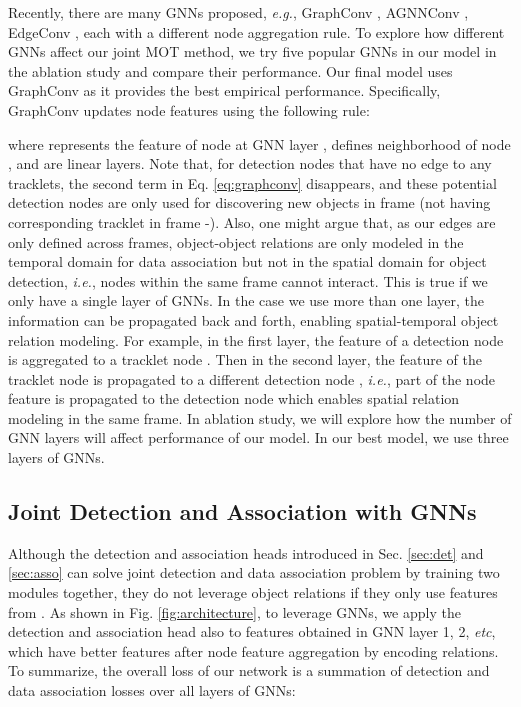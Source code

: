 \documentclass[letterpaper, 10 pt, conference]{ieeeconf}
\begin{document}
Recently, there are many GNNs proposed, \emph{e.g.}, GraphConv \cite{Morris2019}, AGNNConv \cite{thekumparampil2018attentionbased}, EdgeConv \cite{Wang2019_graph}, each with a different node aggregation rule. To explore how different GNNs affect our joint MOT method, we try five popular GNNs in our model in the ablation study and compare their performance. Our final model uses GraphConv as it provides the best empirical performance. Specifically, GraphConv updates node features using the following rule:
\vspace{-0.1cm}

where  represents the feature of node  at GNN layer ,  defines neighborhood of node , and  are linear layers. Note that, for detection nodes that have no edge to any tracklets, the second term in Eq. \ref{eq:graphconv} disappears, and these potential detection nodes are only used for discovering new objects in frame  (not having corresponding tracklet in frame -). Also, one might argue that, as our edges are only defined across frames, object-object relations are only modeled in the temporal domain for data association but not in the spatial domain for object detection, \emph{i.e.}, nodes within the same frame cannot interact. This is true if we only have a single layer of GNNs. In the case we use more than one layer, the information can be propagated back and forth, enabling spatial-temporal object relation modeling. For example, in the first layer, the feature of a detection node  is aggregated to a tracklet node . Then in the second layer, the feature of the tracklet node  is propagated to a different detection node , \emph{i.e.}, part of the node feature  is propagated to the detection node  which enables spatial relation modeling in the same frame. In ablation study, we will explore how the number of GNN layers will affect performance of our model. In our best model, we use three layers of GNNs.

\subsection{Joint Detection and Association with GNNs}
Although the detection and association heads introduced in Sec. \ref{sec:det} and \ref{sec:asso} can solve joint detection and data association problem by training two modules together, they do not leverage object relations if they only use features from . As shown in Fig. \ref{fig:architecture}, to leverage GNNs, we apply the detection and association head also to features obtained in GNN layer 1, 2, \emph{etc}, which have better features after node feature aggregation by encoding relations. To summarize, the overall loss of our network is a summation of detection and data association losses over all layers of GNNs:
\vspace{-0.1cm}
\end{document}
